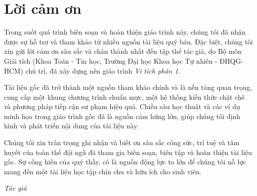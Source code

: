 \chapter*{Lời cảm ơn}


Trong suốt quá trình biên soạn và hoàn thiện giáo trình này, chúng tôi đã nhận được sự hỗ trợ và tham khảo từ nhiều nguồn tài liệu quý báu. Đặc biệt, chúng tôi xin gửi lời cảm ơn sâu sắc và chân thành nhất đến tập thể tác giả, do Bộ môn Giải tích (Khoa Toán - Tin học, Trường Đại học Khoa học Tự nhiên - ĐHQG-HCM) chủ trì, đã xây dựng nên giáo trình \textit{Vi tích phân 1}.

Tài liệu gốc đã trở thành một nguồn tham khảo chính và là nền tảng quan trọng, cung cấp một khung chương trình chuẩn mực, một hệ thống kiến thức chặt chẽ và phương pháp tiếp cận sư phạm hiệu quả. Chiều sâu học thuật và các ví dụ minh họa trong giáo trình gốc đã là nguồn cảm hứng lớn, giúp chúng tôi định hình và phát triển nội dung của tài liệu này.

Chúng tôi xin trân trọng ghi nhận và biết ơn sâu sắc công sức, trí tuệ và tâm huyết của toàn thể đội ngũ đã tham gia biên soạn, biên tập và hoàn thiện tài liệu gốc. Sự cống hiến của quý thầy, cô là nguồn động lực to lớn để chúng tôi nỗ lực mang đến một tài liệu học tập chỉn chu và hữu ích cho sinh viên.

\vspace{2cm} %
\hfill \textit{Tác giả}
